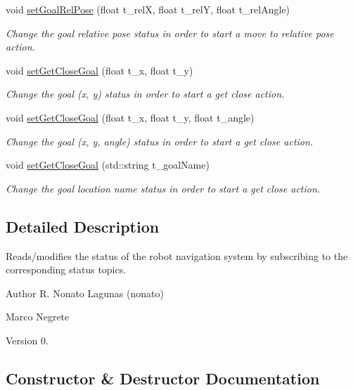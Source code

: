 \begin{DoxyCompactItemize}
void \hyperlink{class_navigation_status_a15f90efbbfbeba3301f20e42ef1d66b6}{set\+Goal\+Rel\+Pose} (float t\+\_\+relX, float t\+\_\+relY, float t\+\_\+rel\+Angle)
\begin{DoxyCompactList}\small\item\em Change the goal relative pose status in order to start a move to relative pose action. \end{DoxyCompactList}\item 
void \hyperlink{class_navigation_status_ab9b2215d5144a13e2e033b17d9654a8f}{set\+Get\+Close\+Goal} (float t\+\_\+x, float t\+\_\+y)
\begin{DoxyCompactList}\small\item\em Change the goal (x, y) status in order to start a get close action. \end{DoxyCompactList}\item 
void \hyperlink{class_navigation_status_ac77fe3884fbe9d9c5788aa0997c68806}{set\+Get\+Close\+Goal} (float t\+\_\+x, float t\+\_\+y, float t\+\_\+angle)
\begin{DoxyCompactList}\small\item\em Change the goal (x, y, angle) status in order to start a get close action. \end{DoxyCompactList}\item 
void \hyperlink{class_navigation_status_a6ab45826292bef7eb478f1acdec98cdb}{set\+Get\+Close\+Goal} (std\+::string t\+\_\+goal\+Name)
\begin{DoxyCompactList}\small\item\em Change the goal location name status in order to start a get close action. \end{DoxyCompactList}\end{DoxyCompactItemize}


\subsection{Detailed Description}
Reads/modifies the status of the robot navigation system by subscribing to the corresponding status topics. 

\begin{DoxyAuthor}{Author}
R. Nonato Lagunas (nonato) 

Marco Negrete 
\end{DoxyAuthor}
\begin{DoxyVersion}{Version}
0. 
\end{DoxyVersion}


\subsection{Constructor \& Destructor Documentation}
